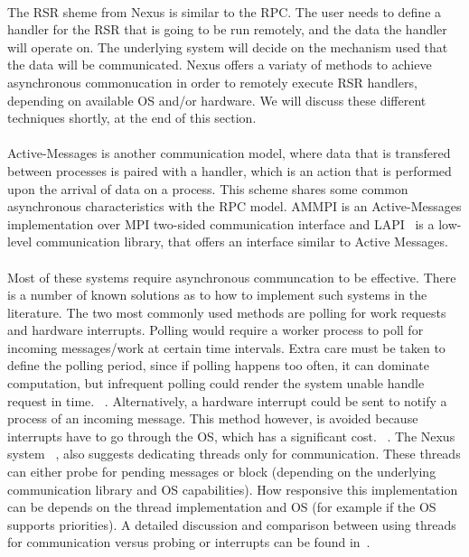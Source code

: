 \paragraph{}
The RSR sheme from Nexus\cite{Foster96thenexus} is similar to the RPC. The user needs to define a handler for the 
RSR that is going to be run remotely, and the data the handler will operate on.  The underlying system will decide
on the mechanism used that the data will be communicated.  Nexus offers a variaty of methods to achieve asynchronous
commonucation in order to remotely execute RSR handlers, depending on available OS and/or hardware.  
We will discuss these different techniques shortly, at the end of this section. 

\paragraph{}
Active-Messages is another communication model, where data that is transfered between processes is paired with 
a handler, which is an action that is performed upon the arrival of data on a process.  This scheme shares some common
asynchronous characteristics with the RPC model. 
AMMPI\cite{Bonachea:ammpi} is an Active-Messages implementation over MPI two-sided communication
interface and LAPI~\cite{Shah:1998:PEL:876880.879642} is a low-level communication library, that offers an interface
similar to Active Messages.  

\paragraph{}
Most of these systems require asynchronous communcation to be effective.  There is a number of known solutions as 
to how to implement such systems in the literature.  The two most commonly used methods are polling for work requests
~\cite{Beckman96tulip:a, Saunders:2003:AAP:966049.781534, Foster96thenexus, vonEicken:1992:AMM:146628.140382} 
and hardware interrupts.
Polling would require a worker process to poll for incoming messages/work at certain
time intervals.   Extra care must be taken to define the polling period, since if polling happens too often, it can
dominate computation, but infrequent polling could render the system unable handle request in time. 
~\cite{Saunders:2003:AAP:966049.781534, Shah:1998:PEL:876880.879642}.
Alternatively, a hardware interrupt could be sent to notify a process of an incoming message.  This method however,
is avoided because interrupts have to go through the OS, which has a significant cost. 
~\cite{Saunders:2003:AAP:966049.781534, Shah:1998:PEL:876880.879642, Foster96thenexus, vonEicken:1992:AMM:146628.140382}.
The Nexus system ~\cite{Foster96thenexus}, also suggests dedicating threads only for communication.  These threads can 
either probe for pending messages or block (depending on the underlying communication library and OS capabilities).
How responsive this implementation can be depends on the thread implementation and OS (for example if the OS supports
priorities).  A detailed discussion and comparison between using threads for communication versus probing or interrupts
can be found in~\cite{Foster96thenexus}.


